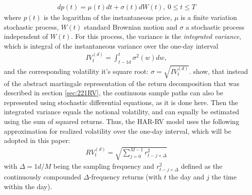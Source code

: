 \begin{align}\label{eq:return-process-corsi}
dp(t) = \mu(t)dt + \sigma(t)dW(t), \ 0 \leq t \leq T
\end{align}
where $p(t)$ is the logarithm of the instantaneous price, $\mu$ is a finite variation stochastic process, $W(t)$ standard Brownian motion and $\sigma$ a stochastic process independent of $W(t)$. For this process, the variance is the \emph{integrated variance}, which is integral of the instantaneous variance over the one-day interval
\begin{align}
IV_{t}^{(d)} =  \int_{t-1d}^{t} \sigma^{2}(w)dw, 
\end{align}
and the corresponding volatility it's square root: $\sigma = \sqrt{IV_{t}^{(d)}}$.
\textcite{andersen2001} show, that instead of the abstract martingale representation of the return decomposition that was described in section \ref{sec:221RV}, the continuous sample paths can also be represented using stochastic differential equations, as it is done here. Then the integrated variance equals the notional volatility, and can equally be estimated using the sum of squared returns. Thus, the HAR-RV model uses the following approximation for realized volatility over the one-day interval, which will be adopted in this paper:
\begin{align}
RV_{t}^{(d)} = \sqrt{\sum_{j=0}^{M-1} r^{2}_{t-j \times \Delta}}
\end{align}
with $\Delta = 1d/M$ being the sampling frequency and $r^{2}_{t-j \times \Delta}$ defined as the continuously compounded $\Delta$-frequency returns (with $t$ the day and $j$ the time within the day). \\

